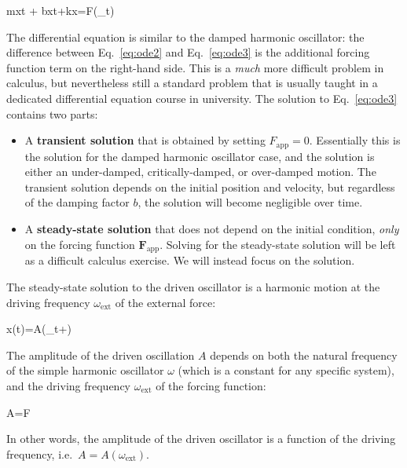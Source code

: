 \begin{important-equation}
  m\diff[2]xt + b\diff xt+kx=F\cos(\omega_t)
  \label{eq:ode3}
\end{important-equation}
The differential equation is similar to the damped harmonic oscillator: the
difference between Eq.~\ref{eq:ode2} and Eq.~\ref{eq:ode3} is the additional
forcing function term on the right-hand side. This is a \emph{much} more
difficult problem in calculus, but nevertheless still a standard problem that
is usually taught in a dedicated differential equation course in university.
The solution to Eq.~\ref{eq:ode3} contains two parts:
\begin{itemize}[itemsep=6pt]
\item A \textbf{transient solution} that is obtained by setting
  $F_\text{app}=0$. Essentially this is the solution for the damped harmonic
  oscillator case, and the solution is either an under-damped,
  critically-damped, or over-damped motion. The transient solution depends on
  the initial position and velocity, but regardless of the damping factor $b$,
  the solution will become negligible over time.
  
\item A \textbf{steady-state solution} that does not depend on the initial
  condition, \emph{only} on the forcing function $\bm F_\text{app}$. Solving for
  the steady-state solution will be left as a difficult calculus exercise.
  We will instead focus on the solution.
\end{itemize}
The steady-state solution to the driven oscillator is a harmonic motion at the
driving frequency $\omega_\text{ext}$ of the external force:
\begin{important-equation}
  x(t)=A\cos(\omega_t+\theta)
  \quad{}
  \label{eq:gen-solution3}
\end{important-equation}
The amplitude of the driven oscillation $A$ depends on both the natural
frequency of the simple harmonic oscillator $\omega$ (which is a constant for
any specific system), and the driving frequency $\omega_\text{ext}$ of the
forcing function:
\begin{important-equation}
  A=\frac F{}
  \label{eq:amplitude1}
\end{important-equation}
In other words, the amplitude of the driven oscillator is a function of the
driving frequency, i.e.\ $A=A(\omega_\text{ext})$.
